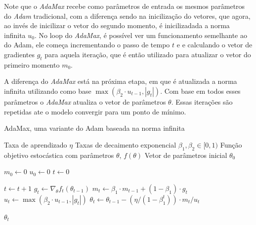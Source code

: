 Note que o \textit{AdaMax} recebe como parâmetros de entrada os mesmos parâmetros do \textit{Adam} tradicional, com a diferença sendo na inicilização do vetores, que agora, ao invés de inicilizar o vetor do segundo momento, é inicilizadada a norma infinita $u_0$. No loop do \textit{AdaMax}, é possível ver um funcionamento semelhante ao do Adam, ele começa incrementando o passo de tempo $t$ e e calculando o vetor de gradientes $g_t$ para aquela iteração, que é então utilizado para atualizar o vetor do primeiro momento $m_0$.

A diferença do \textit{AdaMax} está na próxima etapa, em que é atualizada a norma infinita utilizando como base $\max(\beta_2 \cdot u_{t-1}, |g_t|)$. Com base em todos esses parâmetros o \textit{AdaMax} atualiza o vetor de parâmetros $\theta$. Essas iterações são repetidas ate o modelo convergir para um ponto de mínimo.

\begin{algorithm}[H] %
    \caption{AdaMax, uma variante do Adam baseada na norma infinita}
    \label{alg:adamax}
    \begin{algorithmic}[1] %

    \Require Taxa de aprendizado $\eta$
    \Require Taxas de decaimento exponencial $\beta_1, \beta_2 \in [0, 1)$
    \Require Função objetivo estocástica com parâmetros $\theta$, $f(\theta)$
    \Require Vetor de parâmetros inicial $\theta_0$

    \State $m_0 \leftarrow 0$ 
    \State $u_0 \leftarrow 0$ 
    \State $t \leftarrow 0$ 

        \State $t \leftarrow t + 1$
        \State $g_t \leftarrow \nabla_\theta f_t(\theta_{t-1})$ 
        \State $m_t \leftarrow \beta_1 \cdot m_{t-1} + (1 - \beta_1) \cdot g_t$ 
        \State $u_t \leftarrow \max(\beta_2 \cdot u_{t-1}, |g_t|)$ 
        \State $\theta_t \leftarrow \theta_{t-1} - (\eta / (1 - \beta_1^t)) \cdot m_t / u_t$ 
    \EndWhile

    \State \Return $\theta_t$ 
    \end{algorithmic}
\end{algorithm}

